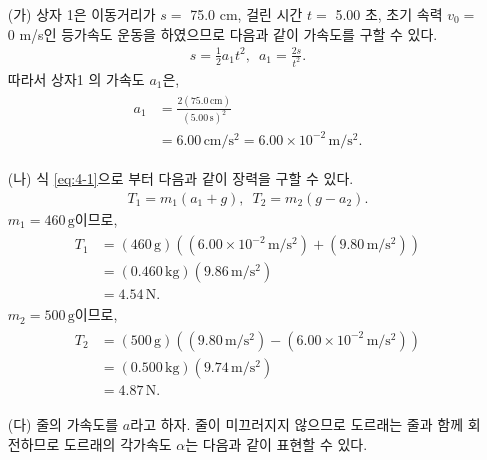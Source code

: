 \documentclass[floatfix,nofootinbib,superscriptaddress,fleqn]{revtex4-2}
\begin{document}
\begin{itemize}
    \item[(가)] 
    상자 1은 이동거리가 $s=$ 75.0 cm, 걸린 시간 $t=$ 5.00 초, 
    초기 속력 $v_0=$ 0 m/s인 등가속도 운동을 하였으므로 다음과 같이 가속도를 구할 수 있다.
    \begin{align}\label{eq:4-4}
        s = \frac{1}{2}a_1t^2,\,\,\,a_1 = \frac{2s}{t^2}.
    \end{align}
    따라서 상자1 의 가속도 $a_1$은,
    \begin{align}
        \begin{split}
            a_1 &= \frac{2(75.0\,\mathrm{cm})}{(5.00\,\mathrm{s})^2} \\
            &= 6.00\,\mathrm{cm/s^2} = 6.00\times 10^{-2}\,\mathrm{m/s^2}.
        \end{split}
    \end{align}
    \item[(나)]
    식 \eqref{eq:4-1}으로 부터 다음과 같이 장력을 구할 수 있다.
    \begin{align}\label{eq:4-5}
       T_1 =m_1\left( a_1+g \right),\,\,\,
       T_2 =m_2\left( g-a_2 \right).
    \end{align}
    $m_1 = 460\,\mathrm{g}$이므로,
    \begin{align}
        \begin{split}
            T_1 &= (460\,\mathrm{g})
            ((6.00\times 10^{-2}\,\mathrm{m/s^2})+(9.80\,\mathrm{m/s^2})) \\
            &=(0.460\,\mathrm{kg})
            (9.86\,\mathrm{m/s^2}) \\
            &=4.54\,\mathrm{N}.
        \end{split}
    \end{align} 
    $m_2 = 500\,\mathrm{g}$이므로,
    \begin{align}
        \begin{split}
            T_2 &= (500\,\mathrm{g})
            ((9.80\,\mathrm{m/s^2})-(6.00\times 10^{-2}\,\mathrm{m/s^2})) \\
            &=(0.500\,\mathrm{kg})
            (9.74\,\mathrm{m/s^2}) \\
            &=4.87\,\mathrm{N}.
        \end{split}
    \end{align} 
    \item[(다)] 줄의 가속도를 $a$라고 하자. 
    줄이 미끄러지지 않으므로 도르래는 줄과 함께 회전하므로 도르래의 각가속도 $\alpha$는 
    다음과 같이 표현할 수 있다.
    \begin{align}\label{eq:4-6}

\end{align}
\end{itemize}
\end{document}
